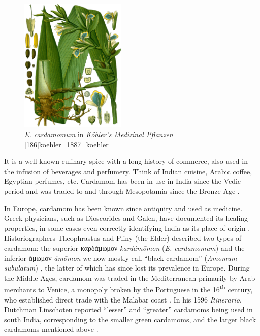 \documentclass[12pt]{article}
\begin{document}
\begin{figure}[!h]
    \centering
    \includegraphics[width=0.45\textwidth]{imgs/cardamom.png}
    \caption{\textit{E. cardamomum} in \textit{Köhler's Medizinal Pflanzen} [186]{koehler_1887_koehler}}
    \label{fig:plant}
\end{figure}


It is a well-known culinary spice with a long history of commerce, also used in the infusion of beverages and perfumery. Think of Indian cuisine, Arabic coffee, Egyptian perfumes, etc. Cardamom has been in use in India since the Vedic period and was traded to and through Mesopotamia since the Bronze Age \parencite{ravindran_2002_cardamom}. 

In Europe, cardamom has been known since antiquity and used as medicine. Greek physicians, such as Dioscorides and Galen, have documented its healing properties, in some cases even correctly identifying India as its place of origin \parencites{parry_1969_spices}{anderson_2023_history}. Historiographers Theophrastus and Pliny (the Elder) described two types of cardamom: the superior καρδάμωμον \textit{kardámōmon} (\textit{E. cardamomum}) and the inferior ἄμωμον \textit{ámōmon} we now mostly call ``black cardamom'' (\textit{Amomum subulatum}) \parencite{prance_2005_cultural}, the latter of which has since lost its prevalence in Europe. During the Middle Ages, cardamom was traded in the Mediterranean primarily by Arab merchants to Venice, a monopoly broken by the Portuguese in the 16\textsuperscript{th} century, who established direct trade with the Malabar coast \parencite{cumo_2013_encyclopedia}. In his 1596 \textit{Itinerario}, Dutchman Linschoten reported ``lesser'' and ``greater'' cardamoms being used in south India, corresponding to the smaller green cardamoms, and the larger black cardamoms mentioned above \parencite{nair_2006_agronomy}.
\end{document}
